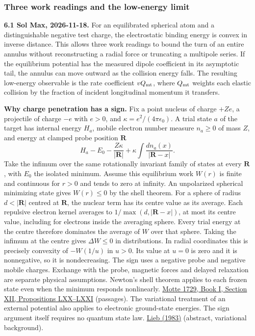 \documentclass[11pt,a4paper]{article}
\begin{document}
\subsubsection{Three work readings and the low-energy
limit}\label{three-work-readings-and-the-low-energy-limit}

\textbf{6.1 Sol Max, 2026-11-18.} For an equilibrated spherical atom and
a distinguishable negative test charge, the electrostatic binding energy
is convex in inverse distance. This allows three work readings to bound
the turn of an entire annulus without reconstructing a radial force or
truncating a multipole series. If the equilibrium potential has the
measured dipole coefficient in its asymptotic tail, the annulus can move
outward as the collision energy falls. The resulting low-energy
observable is the rate coefficient \(vQ_{\rm mt}\), where \(Q_{\rm mt}\)
weights each elastic collision by the fraction of incident longitudinal
momentum it transfers.

\textbf{Why charge penetration has a sign.} Fix a point nucleus of
charge \(+Ze\), a projectile of charge \(-e\) with \(e>0\), and
\(\kappa=e^2/(4\pi\epsilon_0)\). A trial state \(a\) of the target has
internal energy \(H_a\), mobile electron number measure \(n_a\ge0\) of
mass \(Z\), and energy at clamped probe position \(\mathbf R\) \[
 H_a-E_0-\frac{Z\kappa}{|\mathbf R|}
       +\kappa\int\frac{dn_a(x)}{|\mathbf R-x|}.
\] Take the infimum over the same rotationally invariant family of
states at every \(\mathbf R\), with \(E_0\) the isolated minimum. Assume
this equilibrium work \(W(r)\) is finite and continuous for \(r>0\) and
tends to zero at infinity. An unpolarized spherical minimizing state
gives \(W(r)\le0\) by the shell theorem. For a sphere of radius
\(d<|\mathbf R|\) centred at \(\mathbf R\), the nuclear term has its
centre value as its average. Each repulsive electron kernel averages to
\(1/\max(d,|\mathbf R-x|)\), at most its centre value, including for
electrons inside the averaging sphere. Every trial energy at the centre
therefore dominates the average of \(W\) over that sphere. Taking the
infimum at the centre gives \(\Delta W\le0\) in distributions. In radial
coordinates this is precisely convexity of \(-W(1/u)\) in \(u>0\). Its
value at \(u=0\) is zero and it is nonnegative, so it is nondecreasing.
The sign uses a negative probe and negative mobile charges. Exchange
with the probe, magnetic forces and delayed relaxation are separate
physical assumptions. Newton's shell theorem applies to each frozen
state even when the minimum responds nonlinearly.
\href{https://en.wikisource.org/wiki/The_Mathematical_Principles_of_Natural_Philosophy_\%281729\%29/Book_1/Section_12}{Motte
1729, Book I, Section XII, Propositions LXX--LXXI} (passages). The
variational treatment of an external potential also applies to
electronic ground-state energies. The sign argument itself requires no
quantum state law. \href{https://doi.org/10.1002/qua.560240302}{Lieb
(1983)} (abstract, variational background).
\end{document}
